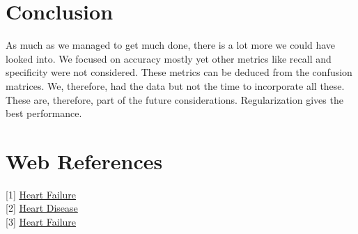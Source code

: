 \section{Conclusion}
As much as we managed to get much done, there is a lot more we could have looked into. We focused on accuracy mostly yet other metrics like recall and specificity were not considered. These metrics can be deduced from the confusion matrices. We, therefore, had the data but not the time to incorporate all these. These are, therefore, part of the future considerations. Regularization gives the best performance.

\newpage
\section{Web References}
[1] \href{https://my.clevelandclinic.org/health/diseases/17069-heart-failure-understanding-heart-failure}{Heart Failure} \\

[2] \href{https://my.clevelandclinic.org/health/diseases/17069-heart-failure-understanding-heart-failure}{Heart Disease} \\

[3] \href{https://my.clevelandclinic.org/health/diseases/17069-heart-failure-understanding-heart-failure}{Heart Failure} \\

    
    